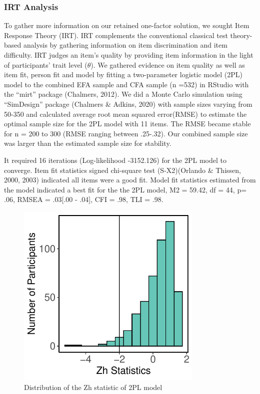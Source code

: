 \documentclass[
  english,
  man]{apa6}
\begin{document}
\hypertarget{irt-analysis}{%
\subsubsection{IRT Analysis}\label{irt-analysis}}

To gather more information on our retained one-factor solution, we sought Item Response Theory (IRT). IRT complements the conventional classical test theory-based analysis by gathering information on item discrimination and item difficulty. IRT judges an item's quality by providing item information in the light of participants' trait level (\(\theta\)). We gathered evidence on item quality as well as item fit, person fit and model by fitting a two-parameter logistic model (2PL) model to the combined EFA sample and CFA sample (n =532) in RStudio with the ``mirt'' package (Chalmers, 2012). We did a Monte Carlo simulation using ``SimDesign'' package (Chalmers \& Adkins, 2020) with sample sizes varying from 50-350 and calculated average root mean squared error(RMSE) to estimate the optimal sample size for the 2PL model with 11 items. The RMSE became stable for n = 200 to 300 (RMSE ranging between .25-.32). Our combined sample size was larger than the estimated sample size for stability.

It required 16 iterations (Log-likelihood -3152.126) for the 2PL model to converge. Item fit statistics signed chi-square test (S-X2)(Orlando \& Thissen, 2000, 2003) indicated all items were a good fit. Model fit statistics estimated from the model indicated a best fit for the the 2PL model, M2 = 59.42, df = 44, p= .06, RMSEA = .03{[}.00 - .04{]}, CFI = .98, TLI = .98.

\begin{figure}
\includegraphics[width=3.5in]{Figures/600/personfit} \caption{Distribution of the Zh statistic of 2PL model}\label{fig:figfmisfit}
\end{figure}
\end{document}

